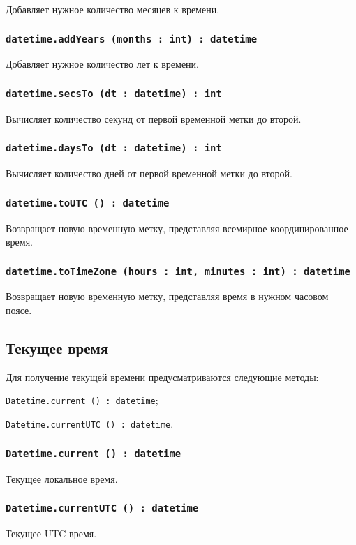 Добавляет нужное количество месяцев к времени.

\subsubsection{\lstinline|datetime.addYears (months : int) : datetime|}

Добавляет нужное количество лет к времени.

\subsubsection{\lstinline|datetime.secsTo (dt : datetime) : int|}

Вычисляет количество секунд от первой временной метки до второй.

\subsubsection{\lstinline|datetime.daysTo (dt : datetime) : int|}

Вычисляет количество дней от первой временной метки до второй.

\subsubsection{\lstinline|datetime.toUTC () : datetime|}

Возвращает новую временную метку, представляя всемирное координированное время.

\subsubsection{\lstinline|datetime.toTimeZone (hours : int, minutes : int) : datetime|}

Возвращает новую временную метку, представляя время в нужном часовом поясе.

\subsection{Текущее время}

Для получение текущей времени предусматриваются следующие методы:
\begin{icItems}
	\item \lstinline|Datetime.current () : datetime|;
	\item \lstinline|Datetime.currentUTC () : datetime|.
\end{icItems}

\subsubsection{\lstinline|Datetime.current () : datetime|}

Текущее локальное время.

\subsubsection{\lstinline|Datetime.currentUTC () : datetime|}

Текущее UTC время.
